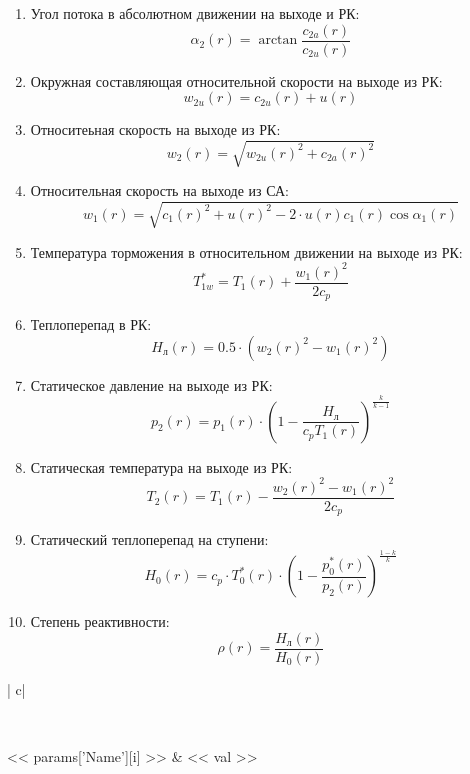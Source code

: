 \documentclass[a4paper,10pt]{article}
\begin{document}
\begin{enumerate}
        \item Угол потока в абсолютном движении на выходе и РК:
        \[
            \alpha_2 (r) = \arctan{\frac{c_{2a}(r)}{c_{2u}(r)}}
        \]

        \item Окружная составляющая относительной скорости на выходе из РК:
        \[
            w_{2u}(r) = c_{2u}(r) + u(r)
        \]

        \item Относитеьная скорость на выходе из РК:
        \[
            w_2 (r) = \sqrt{w_{2u}(r)^2 + c_{2a}(r)^2}
        \]

        \item Относительная скорость на выходе из СА:
        \[
            w_1 (r) = \sqrt{c_1(r)^2 + u(r)^2 - 2 \cdot u(r) c_1(r) \cos{\alpha_1(r)}}
        \]

        \item Температура торможения в относительном движении на выходе из РК:
        \[
            T_{1w}^* = T_1(r) + \frac{w_1(r) ^ 2}{2 c_p}
        \]

        \item Теплоперепад в РК:
        \[
            H_л (r) = 0.5 \cdot (w_2(r)^2 - w_1(r)^2)
        \]

        \item Статическое давление на выходе из РК:
        \[
            p_2 (r) = p_1(r) \cdot \left( 1 - \frac{H_л}{c_p T_1(r)} \right) ^ {\frac{k}{k - 1}}
        \]

        \item Статическая температура на выходе из РК:
        \[
            T_2 (r) = T_1 (r) - \frac{w_2 (r)^2 - w_1(r)^2}{2 c_p}
        \]

        \item Статический теплоперепад на ступени:
        \[
            H_0 (r) = c_p \cdot T_0^*(r) \cdot \left( 1 - \frac{p_0^*(r)}{p_2(r)} \right) ^ {\frac{1 - k}{k}}
        \]

        \item Степень реактивности:
        \[
            \rho (r) = \frac{H_л (r)}{H_0 (r)}
        \]

    \end{enumerate}

    \begin{longtable}{
    |
    c|
    }
        \caption{<< caption >>}\\
        \hline

        << params['Name'][i] >>
        & << val >>
        \\
        \hline

    \end{longtable}

\end{document}
